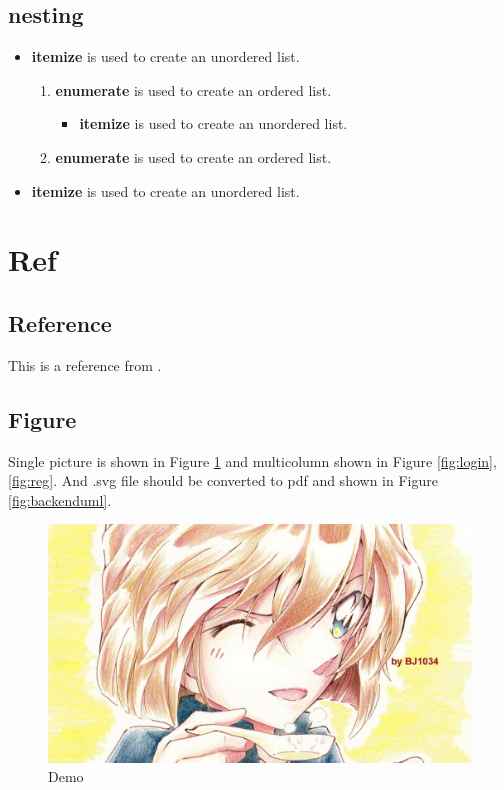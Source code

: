 \documentclass[twoside,11pt]{article}
\begin{document}
\subsection{nesting}
\begin{itemize}
    \item \textbf{itemize} is used to create an unordered list.
          \begin{enumerate}
              \item \textbf{enumerate} is used to create an ordered list.
                    \begin{itemize}
                        \item \textbf{itemize} is used to create an unordered list.
                    \end{itemize}
              \item \textbf{enumerate} is used to create an ordered list.
          \end{enumerate}
    \item \textbf{itemize} is used to create an unordered list.

\end{itemize}
\newpage


\section{Ref}

\subsection{Reference}
This is a reference from \cite{BOOK}.

\subsection{Figure}

Single picture is shown in Figure \ref{fig:demo} and multicolumn shown in Figure \ref{fig:login}, \ref{fig:reg}. And .svg file should be converted to pdf and shown in Figure \ref{fig:backenduml}.

\begin{figure}[H]
    \centering
    \includegraphics[width=0.8\columnwidth]{figures/demo.png}
    \caption{Demo}
    \label{fig:demo}
\end{figure}
\end{document}
